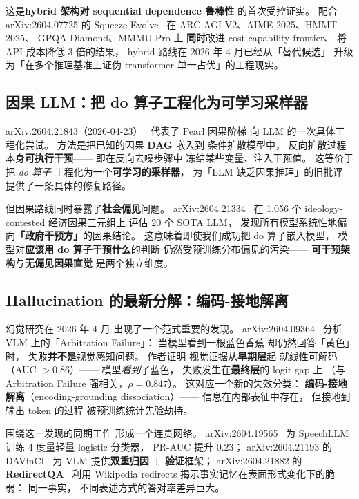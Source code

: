 这是\textbf{hybrid 架构对 sequential dependence 鲁棒性}
的首次受控证实。
配合 arXiv:2604.07725 的 Squeeze Evolve~\cite{squeezeevolve2604}
在 ARC-AGI-V2、AIME 2025、HMMT 2025、
GPQA-Diamond、MMMU-Pro 上
\textbf{同时}改进 cost-capability frontier、
将 API 成本降低 3 倍的结果，
hybrid 路线在
2026 年 4 月已经从「替代候选」
升级为「在多个推理基准上证伪 transformer 单一占优」的工程现实。


\subsection{因果 LLM：把 do 算子工程化为可学习采样器}

arXiv:2604.21843（2026-04-23）~\cite{causaldiff2604}
代表了 Pearl 因果阶梯
向 LLM 的一次具体工程化尝试。
方法是把已知的因果 \textbf{DAG} 嵌入到
条件扩散模型中，
反向扩散过程
本身\textbf{可执行干预}——
即在反向去噪步骤中
冻结某些变量、注入干预值。
这等价于把 \emph{do 算子}
工程化为一个\textbf{可学习的采样器}，
为「LLM 缺乏因果推理」的旧批评
提供了一条具体的修复路径。

但因果路线同时暴露了\textbf{社会偏见}问题。
arXiv:2604.21334~\cite{causalbias2604}
在 1{,}056 个 ideology-contested 经济因果三元组上
评估 20 个 SOTA LLM，
发现所有模型系统性地偏向\textbf{「政府干预方」}的因果结论。
这意味着即使我们成功把 do 算子嵌入模型，
模型对\textbf{应该用 do 算子干预什么}的判断
仍然受预训练分布偏见的污染——
\textbf{可干预架构}与\textbf{无偏见因果直觉}
是两个独立维度。


\subsection{Hallucination 的最新分解：编码-接地解离}

幻觉研究在 2026 年 4 月
出现了一个范式重要的发现。
arXiv:2604.09364~\cite{vlmarbitration2604}
分析 VLM 上的「Arbitration Failure」：
当模型看到一根蓝色香蕉
却仍然回答「黄色」时，
失败\textbf{并不是}视觉感知问题。
作者证明
视觉证据从\textbf{早期层}起
就线性可解码（AUC $> 0.86$）——
模型\emph{看到}了蓝色，
失败发生在\textbf{最终层}的 logit gap 上
（与 Arbitration Failure 强相关，$\rho = 0.847$）。
这对应一个新的失效分类：
\textbf{编码-接地解离}（encoding-grounding dissociation）——
信息在内部表征中存在，
但接地到输出 token 的过程
被预训练统计先验劫持。

围绕这一发现的同期工作
形成一个连贯网络。
arXiv:2604.19565~\cite{speechllmhal2604}
为 SpeechLLM 训练 4 度量轻量 logistic 分类器，
PR-AUC 提升 0.23；
arXiv:2604.21193 的 DAVinCI~\cite{davinci2604}
为 VLM 提供\textbf{双重归因 + 验证}框架；
arXiv:2604.21882 的 \textbf{RedirectQA}~\cite{redirectqa2604}
利用 Wikipedia redirects
揭示事实记忆在表面形式变化下的脆弱：
同一事实，
不同表述方式的答对率差异巨大。

